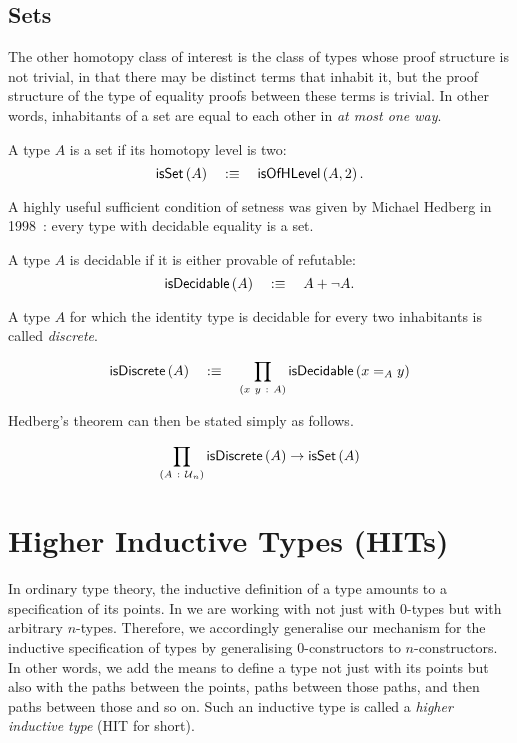 \subsection{Sets}

The other homotopy class of interest is the class of types whose proof structure is not
trivial, in that there may be distinct terms that inhabit it, but the proof structure of
the type of equality proofs between these terms is trivial. In other words, inhabitants of
a set are equal to each other in \emph{at most one way}.
\begin{defn}[Set]\label{defn:hset}
  A type $A$ is a set if its homotopy level is two:
  \begin{equation*}
    \mathsf{isSet}\left(A\right) \quad:\equiv\quad \mathsf{isOfHLevel}\left(A, 2\right).
  \end{equation*}
\end{defn}

A highly useful sufficient condition of setness was given by Michael Hedberg in
1998~\cite{hedberg}: every type with decidable equality is a set.
\begin{defn}[Decidability]
  A type $A$ is decidable if it is either provable of refutable:
  \begin{equation*}
    \mathsf{isDecidable}\left(A\right) \quad:\equiv\quad A + \neg A.
  \end{equation*}
\end{defn}

A type $A$ for which the identity type is decidable for every two inhabitants is called
\emph{discrete}.
\begin{defn}[Discrete]
  \begin{equation*}
    \mathsf{isDiscrete}\left(A\right) \quad:\equiv\quad \prod_{(x~y~:~A)} \mathsf{isDecidable}\left(x =_A y\right)
  \end{equation*}
\end{defn}

Hedberg's theorem can then be stated simply as follows.
\begin{thm}[Hedberg]\label{thm:hedberg}
  \begin{equation*}
    \prod_{(A~:~\mathcal{U}{}_n)} \mathsf{isDiscrete}\left(A\right) \rightarrow \mathsf{isSet}\left(A\right)
  \end{equation*}
\end{thm}

\section{Higher Inductive Types (HITs)}

In ordinary type theory, the inductive definition of a type amounts to a specification of
its points. In \UF{} we are working with not just with $0$-types but with arbitrary
$n$-types. Therefore, we accordingly generalise our mechanism for the inductive
specification of types by generalising $0$-constructors to $n$-constructors. In other
words, we add the means to define a type not just with its points but also with the paths
between the points, paths between those paths, and then paths between those and so on.
Such an inductive type is called a \emph{higher inductive type} (HIT for short).

